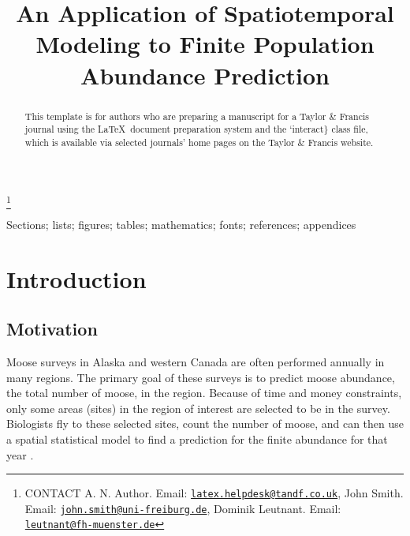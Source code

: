 \documentclass[]{interact}
\theoremstyle{plain}%
\theoremstyle{definition}
\theoremstyle{remark}
\begin{document}

\title{An Application of Spatiotemporal Modeling to Finite Population
Abundance Prediction}


\author{
}

\thanks{CONTACT A. N.
Author. Email: \href{mailto:latex.helpdesk@tandf.co.uk}{\nolinkurl{latex.helpdesk@tandf.co.uk}}, John
Smith. Email: \href{mailto:john.smith@uni-freiburg.de}{\nolinkurl{john.smith@uni-freiburg.de}}, Dominik
Leutnant. Email: \href{mailto:leutnant@fh-muenster.de}{\nolinkurl{leutnant@fh-muenster.de}}}

\maketitle

\begin{abstract}
This template is for authors who are preparing a manuscript for a Taylor
\& Francis journal using the \LaTeX~document preparation system and the
`interact\} class file, which is available via selected journals' home
pages on the Taylor \& Francis website.
\end{abstract}

\begin{keywords}
Sections; lists; figures; tables; mathematics; fonts; references;
appendices
\end{keywords}

\section{Introduction}

\subsection{Motivation}

Moose surveys in Alaska and western Canada are often performed annually
in many regions. The primary goal of these surveys is to predict moose
abundance, the total number of moose, in the region. Because of time and
money constraints, only some areas (sites) in the region of interest are
selected to be in the survey. Biologists fly to these selected sites,
count the number of moose, and can then use a spatial statistical model
to find a prediction for the finite abundance for that year
\citep{ver2008spatial}.
\end{document}
